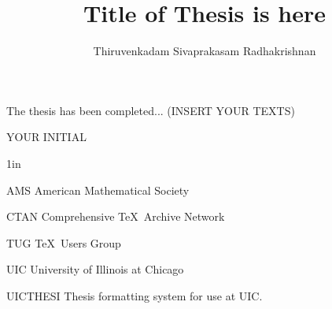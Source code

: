 \documentclass{uicthesi}
\begin{document}

\title{Title of Thesis is here}
\author{Thiruvenkadam Sivaprakasam Radhakrishnan}
\pdegrees{}
\maketitle




 \acknowledgements
{The thesis has been completed... (INSERT YOUR TEXTS)\\ 

\begin{flushright}YOUR INITIAL\end{flushright}}


\tableofcontents
\listoftables
\listoffigures
\listofabbreviations
\begin{list}
{}
{\setlength
  {}{1in}
    \setlength{\leftmargin}{1.5in}
    \setlength{\labelsep}{.5in}
    \setlength{\rightmargin}{\leftmargin}}
\item[AMS\hfill] American Mathematical Society
\item[CTAN\hfill] Comprehensive \TeX\ Archive Network
\item[TUG\hfill] \TeX\ Users Group
\item[UIC\hfill] University of Illinois at Chicago
\item[UICTHESI\hfill] Thesis formatting system for use at UIC.
\end{list}
 
\end{document}
